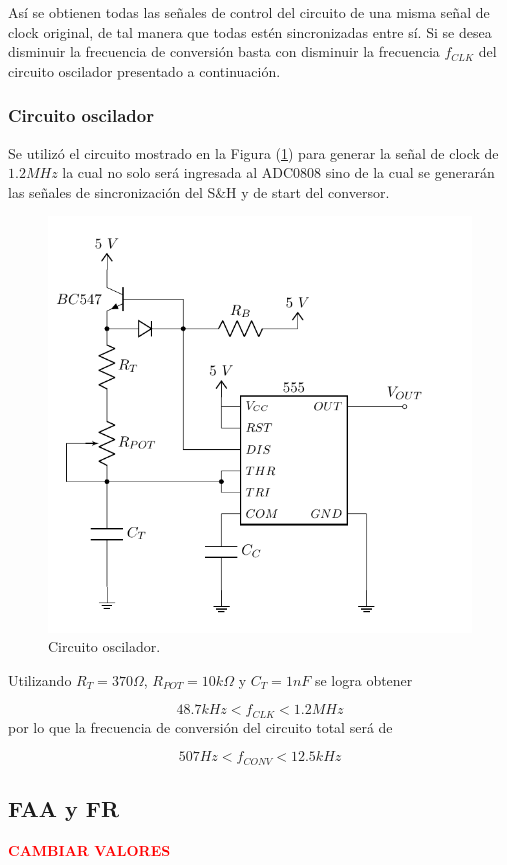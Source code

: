 Así se obtienen todas las señales de control del circuito de una misma señal de clock original, de tal manera que todas estén sincronizadas entre sí. Si se desea disminuir la frecuencia de conversión basta con disminuir la frecuencia $f_{CLK}$ del circuito oscilador presentado a continuación.

\subsubsection{Circuito oscilador}

Se utilizó el circuito mostrado en la Figura (\ref{555}) para generar la señal de clock de $1.2MHz$ la cual no solo será ingresada al ADC0808 sino de la cual se generarán las señales de sincronización del S\&H y de start del conversor.

\begin{figure}[H]
\centering
\includegraphics[width=0.6\linewidth, page=1]{ImagenesEjercicio1/Components.pdf}
\caption{Circuito oscilador.}
\label{555}
\end{figure}

Utilizando $R_{T} = 370\Omega$, $R_{POT} = 10k\Omega$ y $C_{T} = 1nF$ se logra obtener

\[ 48.7kHz < f_{CLK} < 1.2MHz\]
por lo que la frecuencia de conversión del circuito total será de

\[ 507Hz < f_{CONV} < 12.5kHz \]

\subsection{FAA y FR}
\begin{center}
	\LARGE{\textcolor{red}{\textbf{CAMBIAR VALORES}}}
\end{center}


